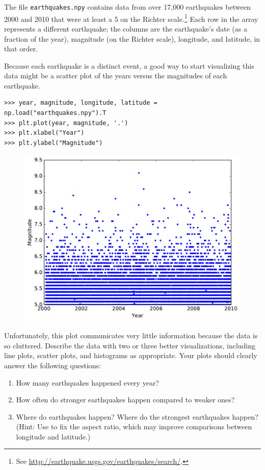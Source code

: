 \begin{problem} %
The file \texttt{earthquakes.npy} contains data from over 17,000 earthquakes between 2000 and 2010 that were at least a 5 on the Richter scale.\footnote{See \url{http://earthquake.usgs.gov/earthquakes/search/}.}
Each row in the array represents a different earthquake;
the columns are the earthquake's date (as a fraction of the year), magnitude (on the Richter scale), longitude, and latitude, in that order.

Because each earthquake is a distinct event, a good way to start visualizing this data might be a scatter plot of the years versus the magnitudes of each earthquake.

\begin{lstlisting}
>>> year, magnitude, longitude, latitude = np.load("earthquakes.npy").T
>>> plt.plot(year, magnitude, '.')
>>> plt.xlabel("Year")
>>> plt.ylabel("Magnitude")
\end{lstlisting}

\begin{figure}[H] %
    \centering
    \includegraphics[width=.7\textwidth]{figures/earthquake.pdf}
\end{figure}

Unfortunately, this plot communicates very little information because the data is so cluttered.
Describe the data with two or three better visualizations, including line plots, scatter plots, and histograms as appropriate.
Your plots should clearly answer the following questions:
\begin{enumerate}
    \item How many earthquakes happened every year?
    \item How often do stronger earthquakes happen compared to weaker ones?
    \item Where do earthquakes happen? Where do the strongest earthquakes happen?
    \\(Hint: Use  to fix the aspect ratio, which may improve comparisons between longitude and latitude.)
\end{enumerate}
\end{problem}

